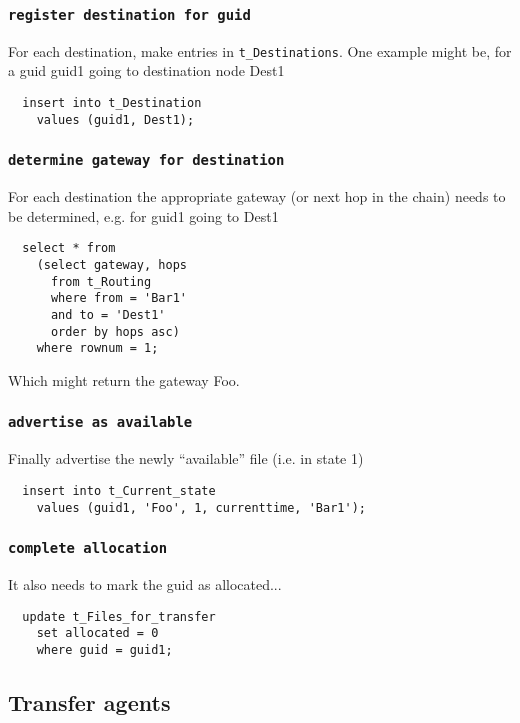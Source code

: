 \documentclass{cmspaper}
\begin{document}
\subsubsection{\textbf{\texttt{register destination for guid}}}
For each destination, make entries in \texttt{t\_Destinations}. One example might be, for a guid guid1 going to destination node Dest1

{\small\begin{verbatim}
  insert into t_Destination
    values (guid1, Dest1);
\end{verbatim}}

\subsubsection{\textbf{\texttt{determine gateway for destination}}}
For each destination the appropriate gateway (or next hop in the chain) needs to be determined, e.g. for guid1 going to Dest1

{\small\begin{verbatim}
  select * from
    (select gateway, hops
      from t_Routing
      where from = 'Bar1'
      and to = 'Dest1'
      order by hops asc)
    where rownum = 1;
\end{verbatim}}

Which might return the gateway Foo. 

\subsubsection{\textbf{\texttt{advertise as available}}}
Finally advertise the newly ``available'' file (i.e. in state 1)

{\small\begin{verbatim}
  insert into t_Current_state
    values (guid1, 'Foo', 1, currenttime, 'Bar1');
\end{verbatim}}

\subsubsection{\textbf{\texttt{complete allocation}}}
It also needs to mark the guid as allocated...

{\small\begin{verbatim}
  update t_Files_for_transfer 
    set allocated = 0
    where guid = guid1;
\end{verbatim}}


\subsection{Transfer agents}
\end{document}

